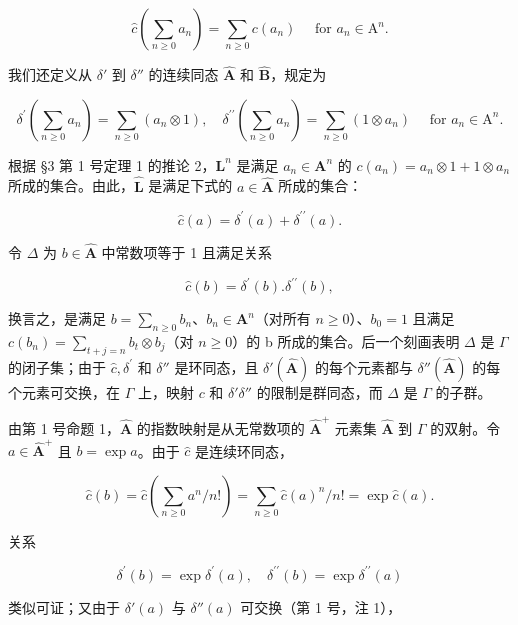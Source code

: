\[
\hat {c} \left(\sum_ {n \geqslant 0} a _ {n}\right) = \sum_ {n \geqslant 0} c (a _ {n}) \quad \text { for } a _ {n} \in \mathrm{A} ^ {n}.
\]

我们还定义从 \(\delta'\) 到 \(\delta''\) 的连续同态 \(\hat{\mathbf{A}}\) 和 \(\hat{\mathbf{B}}\)，规定为

\[
\delta^ {\prime} \left(\sum_ {n \geqslant 0} a _ {n}\right) = \sum_ {n \geqslant 0} (a _ {n} \otimes 1), \quad \delta^ {\prime \prime} \left(\sum_ {n \geqslant 0} a _ {n}\right) = \sum_ {n \geqslant 0} (1 \otimes a _ {n}) \quad \text { for } a _ {n} \in \mathrm{A} ^ {n}.
\]

根据 §3 第 1 号定理 1 的推论 2，\(\mathbf{L}^n\) 是满足 \(a_{n}\in \mathbf{A}^{n}\) 的 \(c(a_{n}) = a_{n}\otimes 1 + 1\otimes a_{n}\) 所成的集合。由此，\(\hat{\mathbf{L}}\) 是满足下式的 \(a\in \hat{\mathbf{A}}\) 所成的集合：

\[
\hat {c} (a) = \delta^ {\prime} (a) + \delta^ {\prime \prime} (a).\tag{3}
\]

令 \(\Delta\) 为 \(b\in \hat{\mathbf{A}}\) 中常数项等于 1 且满足关系

\[
\hat {c} (b) = \delta^ {\prime} (b). \delta^ {\prime \prime} (b),\tag{4}
\]

换言之，是满足 \(b = \sum_{n\geqslant 0}b_n\)、\(b_{n}\in \mathbf{A}^{n}\)（对所有 \(n\geqslant 0\)）、\(b_0 = 1\) 且满足 \(c(b_{n}) = \sum_{t + j = n}b_{t}\otimes b_{j}\)（对 \(n\geqslant 0\)）的 b 所成的集合。后一个刻画表明 \(\Delta\) 是 \(\Gamma\) 的闭子集；由于 \(\hat c,\delta^{\prime}\) 和 \(\delta ''\) 是环同态，且 \(\delta'(\hat{\mathbf A})\) 的每个元素都与 \(\delta''(\hat{\mathbf A})\) 的每个元素可交换，在 \(\Gamma\) 上，映射 \(c\) 和 \(\delta ' \delta''\) 的限制是群同态，而 \(\Delta\) 是 \(\Gamma\) 的子群。

由第 1 号命题 1，\(\hat{\mathbf{A}}\) 的指数映射是从无常数项的 \(\hat{\mathbf{A}}^{+}\) 元素集 \(\hat{\mathbf{A}}\) 到 \(\Gamma\) 的双射。令 \(a \in \hat{\mathbf{A}}^{+}\) 且 \(b = \exp a\)。由于 \(\hat c\) 是连续环同态，

\[
\hat {c} (b) = \hat {c} \left(\sum_ {n \geqslant 0} a ^ {n} / n!\right) = \sum_ {n \geqslant 0} \hat {c} (a) ^ {n} / n! = \exp \hat {c} (a).
\]

关系

\[
\delta^ {\prime} (b) = \exp \delta^ {\prime} (a), \quad \delta^ {\prime \prime} (b) = \exp \delta^ {\prime \prime} (a)
\]

类似可证；又由于 \(\delta'(a)\) 与 \(\delta''(a)\) 可交换（第 1 号，注 1），

